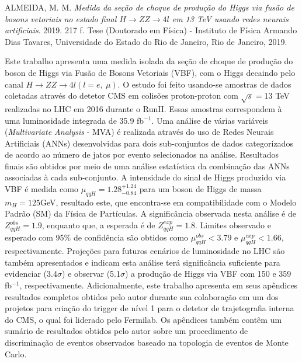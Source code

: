 \documentclass[a4paper,12pt,oneside,onecolumn,final,fleqn]{repUERJ}
\begin{document}
\vspace{0.5cm}
\printkeys %

\hspace{-1.3cm} ALMEIDA, M. M. \textit{Medida da seção de choque de produção do Higgs via fusão de bosons vetoriais no estado final $H \rightarrow ZZ \rightarrow 4l$ em 13 TeV usando redes neurais artificiais}. 2019. 217 f. Tese (Doutorado em Física) - Instituto de Física Armando Dias Tavares, Universidade do Estado do Rio de Janeiro, Rio de Janeiro, 2019.

\vspace{1cm}
Este trabalho apresenta uma medida isolada da seção de choque de produção do boson de Higgs via Fusão de Bosons Vetoriais (VBF), com o Higgs decaindo pelo canal $H \rightarrow ZZ \rightarrow 4l (l=e,~\mu)$. O estudo foi feito usando-se amostras de dados coletadas através do detetor CMS em colisões proton-proton com $\sqrt{s} = 13$ TeV realizadas no LHC em 2016 durante o RunII. Essas amostras correspondem à uma luminosidade integrada de 35.9 fb$^{-1}$. Uma análise de várias variáveis (\textit{Multivariate Analysis} - MVA) é realizada através do uso de Redes Neurais Artificiais (ANNs) desenvolvidas para dois sub-conjuntos de dados categorizados de acordo ao número de jatos por evento selecionados na análise. Resultados finais são obtidos por meio de uma análise estatística da combinação das ANNs associadas à cada sub-conjunto. A intensidade do sinal de Higgs produzido via VBF é medida como $\mu_{qqH} = 1.28^{+1.24}_{-0.84}$ para um boson de Higgs de massa $m_{H} = 125$GeV, resultado este, que encontra-se em compatibilidade com o Modelo Padrão (SM) da Física de Partículas. A significância observada nesta análise é de $Z_{qqH}^{obs} = 1.9$, enquanto que, a esperada é de $Z_{qqH}^{exp} = 1.8$. Limites observado e esperado com 95$\%$ de confidência são obtidos como $\mu_{qqH}^{obs} < 3.79$ e $\mu_{qqH}^{exp} < 1.66$, respectivamente. Projeções para futuros cenários de luminosidade no LHC são também apresentados e indicam esta análise terá significância suficiente para evidenciar (3.4$\sigma$) e observar (5.1$\sigma$) a produção de Higgs via VBF com 150 e 359 fb$^{-1}$, respectivamente. Adicionalmente, este trabalho apresenta em seus apêndices resultados completos obtidos pelo autor durante sua colaboração em um dos projetos para criação do trigger de nível 1 para o detetor de trajetografia interna do CMS, o qual foi liderado pelo Fermilab. Os apêndices também contêm um sumário de resultados obtidos pelo autor sobre um procedimento de discriminação de eventos observados baseado na topologia de eventos de Monte Carlo.
\end{document}

